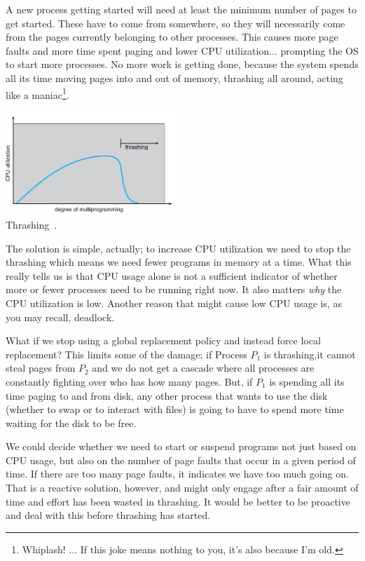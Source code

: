 A new process getting started will need at least the minimum number of pages to get started. These have to come from somewhere, so they will necessarily come from the pages currently belonging to other processes. This causes more page faults and more time spent paging and lower CPU utilization... prompting the OS to start more processes. No more work is getting done, because the system spends all its time moving pages into and out of memory, thrashing all around, acting like a maniac\footnote{Whiplash! ... If this joke means nothing to you, it's also because I'm old.}.

\begin{center}
\includegraphics[width=0.5\textwidth]{images/thrashing.png}\\
Thrashing~\cite{osc}.
\end{center}

The solution is simple, actually; to increase CPU utilization we need to stop the thrashing which means we need fewer programs in memory at a time. What this really tells us is that CPU usage alone is not a sufficient indicator of whether more or fewer processes need to be running right now. It also matters \textit{why} the CPU utilization is low. Another reason that might cause low CPU usage is, as you may recall, deadlock. 

 What if we stop using a global replacement policy and instead force local replacement? This limits some of the damage; if Process $P_{1}$ is thrashing,it cannot steal pages from $P_{2}$ and we do not get a cascade where all processes are constantly fighting over who has how many pages. But, if $P_{1}$ is spending all its time paging to and from disk, any other process that wants to use the disk (whether to swap or to interact with files) is going to have to spend more time waiting for the disk to be free.  
 
We could decide whether we need to start or suspend programs not just based on CPU usage, but also on the number of page faults that occur in a given period of time. If there are too many page faults, it indicates we have too much going on. That is a reactive solution, however, and might only engage after a fair amount of time and effort has been wasted in thrashing. It would be better to be proactive and deal with this before thrashing has started.
 
